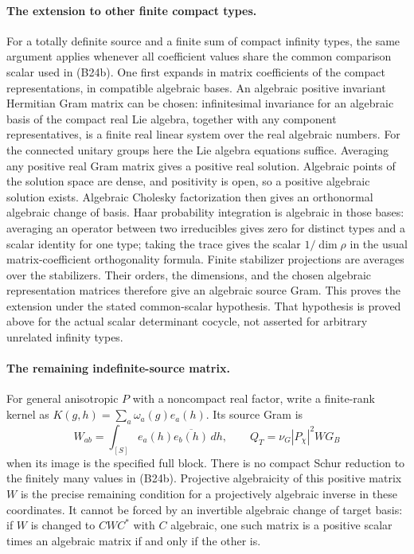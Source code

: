 \paragraph{The extension to other finite compact types.}
For a totally definite source and a finite
sum of compact infinity types, the same
argument applies whenever all coefficient
values share the common comparison scalar
used in (B24b).  One first expands in
matrix coefficients of the compact
representations, in compatible algebraic
bases.  An algebraic positive invariant Hermitian
Gram matrix can be chosen: infinitesimal invariance
for an algebraic basis of the compact real Lie
algebra, together with any component representatives,
is a finite real linear system over the real
algebraic numbers.  For the connected unitary groups
here the Lie algebra equations suffice.  Averaging
any positive real Gram matrix gives a positive real
solution.  Algebraic points of the solution space
are dense, and positivity is open, so a positive
algebraic solution exists.  Algebraic Cholesky
factorization then gives an orthonormal algebraic
change of basis.  Haar probability integration is
algebraic in those bases: averaging an
operator between two irreducibles gives
zero for distinct types and a scalar
identity for one type; taking the trace
gives the scalar $1/\dim\rho$ in the
usual matrix-coefficient orthogonality
formula.  Finite stabilizer projections
are averages over the stabilizers.
Their orders, the dimensions, and the
chosen algebraic representation matrices
therefore give an algebraic source Gram.
This proves the extension under the stated
common-scalar hypothesis.  That hypothesis
is proved above for the actual scalar
determinant cocycle, not asserted for
arbitrary unrelated infinity types.

\paragraph{The remaining indefinite-source matrix.}
For general anisotropic $P$ with a
noncompact real factor, write a finite-rank
kernel as $K(g,h)=\sum_a\omega_a(g)e_a(h)$.
Its source Gram is
\[
 W_{ab}=\int_{[S]}e_a(h)\overline{e_b(h)}\,dh,
 \qquad Q_T=\nu_G|P_\chi|^2W G_B
 \tag{B24f}
\]
when its image is the specified full block.
There is no compact Schur reduction to
the finitely many values in (B24b).
Projective algebraicity of this positive
matrix $W$ is the precise remaining
condition for a projectively algebraic
inverse in these coordinates.  It cannot
be forced by an invertible algebraic
change of target basis: if $W$ is changed
to $CWC^*$ with $C$ algebraic, one such
matrix is a positive scalar times an
algebraic matrix if and only if the
other is.

